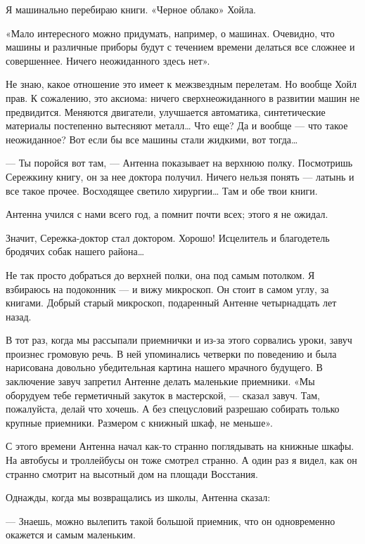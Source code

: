    Я машинально перебираю книги. «Черное облако» Хойла.

   «Мало интересного  можно придумать,  например,  о машинах.  Очевидно,  что
   машины и различные приборы будут с течением времени делаться все сложнее и
   совершеннее. Ничего неожиданного здесь нет».

   Не знаю, какое отношение это имеет к межзвездным перелетам. Но вообще Хойл
   прав. К сожалению, это аксиома: ничего сверхнеожиданного в развитии  машин
   не предвидится. Меняются  двигатели, улучшается автоматика,  синтетические
   материалы постепенно вытесняют металл…  Что еще? Да и  вообще — что  такое
   неожиданное? Вот если бы все машины стали жидкими, вот тогда…

   — Ты поройся вот  там, — Антенна показывает  на верхнюю полку.  Посмотришь
   Сережкину книгу, он за нее доктора получил. Ничего нельзя понять —  латынь
   и все такое прочее. Восходящее светило хирургии… Там и обе твои книги.

   Антенна учился с нами всего год, а помнит почти всех; этого я не ожидал.

   Значит, Сережка-доктор  стал доктором.  Хорошо! Исцелитель  и  благодетель
   бродячих собак нашего района…

   Не так  просто добраться  до  верхней полки,  она  под самым  потолком.  Я
   взбираюсь на подоконник  — и  вижу микроскоп. Он  стоит в  самом углу,  за
   книгами. Добрый  старый  микроскоп, подаренный  Антенне  четырнадцать  лет
   назад.

   В тот раз, когда  мы рассыпали приемнички и  из-за этого сорвались  уроки,
   завуч произнес громовую речь.  В ней упоминались  четверки по поведению  и
   была нарисована довольно убедительная картина нашего мрачного будущего.  В
   заключение  завуч  запретил  Антенне   делать  маленькие  приемники.   «Мы
   оборудуем тебе  герметичный закуток  в мастерской,  — сказал  завуч.  Там,
   пожалуйста, делай что хочешь. А  без спецусловий разрешаю собирать  только
   крупные приемники. Размером с книжный шкаф, не меньше».

   С этого времени Антенна начал как-то странно поглядывать на книжные шкафы.
   На автобусы и троллейбусы он тоже смотрел странно. А один раз я видел, как
   он странно смотрит на высотный дом на площади Восстания.

   Однажды, когда мы возвращались из школы, Антенна сказал:

   — Знаешь,  можно  вылепить такой  большой  приемник, что  он  одновременно
   окажется и самым маленьким.

